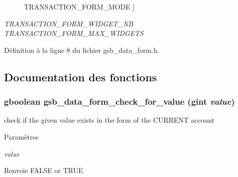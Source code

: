 \begin{Desc}
\begin{description}
{TRANSACTION\_\-FORM\_\-MODE\label{gsb__data__form_8h_ae619a9c249e0b3dd1f3eda88078c03b0a989af19ddc2ec260ae3957be2d805c57}
}]\item[{\em 
TRANSACTION\_\-FORM\_\-WIDGET\_\-NB\label{gsb__data__form_8h_ae619a9c249e0b3dd1f3eda88078c03b0afe4e95e3f2c92829d49740981b2e0c44}
}]\item[{\em 
TRANSACTION\_\-FORM\_\-MAX\_\-WIDGETS\label{gsb__data__form_8h_ae619a9c249e0b3dd1f3eda88078c03b0a07abc0ca9cc42668de10928835379c55}
}]\end{description}
\end{Desc}



Définition à la ligne 8 du fichier gsb\_\-data\_\-form.h.



\subsection{Documentation des fonctions}
\subsubsection[{gsb\_\-data\_\-form\_\-check\_\-for\_\-value}]{\setlength{\rightskip}{0pt plus 5cm}gboolean gsb\_\-data\_\-form\_\-check\_\-for\_\-value (gint {\em value})}\label{gsb__data__form_8h_ae6975b58c5f9085518baa3e97830514b}
check if the given value exists in the form of the CURRENT account


\begin{DoxyParams}{Paramètres}
\item[{\em value}]\end{DoxyParams}
\begin{DoxyReturn}{Renvoie}
FALSE or TRUE 
\end{DoxyReturn}


